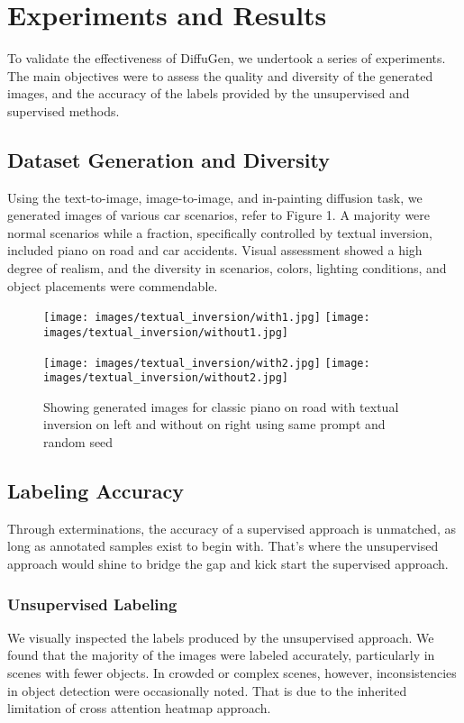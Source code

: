 \documentclass{article}
\begin{document}
\section{Experiments and Results}
To validate the effectiveness of DiffuGen, we undertook a series of experiments. The main objectives were to assess the quality and diversity of the generated images, and the accuracy of the labels provided by the unsupervised and supervised methods.

\subsection{Dataset Generation and Diversity}
Using the text-to-image, image-to-image, and in-painting diffusion task, we generated images of various car scenarios, refer to Figure 1. A majority were normal scenarios while a fraction, specifically controlled by textual inversion, included piano on road and car accidents. Visual assessment showed a high degree of realism, and the diversity in scenarios, colors, lighting conditions, and object placements were commendable.

\begin{figure}[H]
    \centering
    \texttt{[image: images/textual\_inversion/with1.jpg]}
    \texttt{[image: images/textual\_inversion/without1.jpg]}

    \texttt{[image: images/textual\_inversion/with2.jpg]}
    \texttt{[image: images/textual\_inversion/without2.jpg]}

    \caption{Showing generated images for classic piano on road with textual inversion on left and without on right using same prompt and random seed }
    \label{fig:textual_inversion_side_by_side}
\end{figure}


\subsection{Labeling Accuracy}
Through exterminations, the accuracy of a supervised approach is unmatched, as long as annotated samples exist to begin with. That's where the unsupervised approach would shine to bridge the gap and kick start the supervised approach.

\subsubsection{Unsupervised Labeling}
We visually inspected the labels produced by the unsupervised approach. We found that the majority of the images were labeled accurately, particularly in scenes with fewer objects. In crowded or complex scenes, however, inconsistencies in object detection were occasionally noted. That is due to the inherited limitation of cross attention heatmap approach. 
\end{document}
